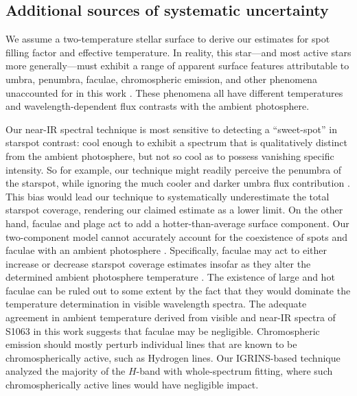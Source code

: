 \documentclass[trackchanges]{aastex631}
\begin{document}





\subsection{Additional sources of systematic uncertainty}
\label{sec:uncertainties}
We assume a two-temperature stellar surface to derive our estimates for spot filling factor and effective temperature.  In reality, this star---and most active stars more generally---must exhibit a range of apparent surface features attributable to umbra, penumbra, faculae, chromospheric emission, and other phenomena unaccounted for in this work \citep{berdyugina05, 2009A&ARv..17..251S}. These phenomena all have different temperatures and wavelength-dependent flux contrasts with the ambient photosphere.

Our near-IR spectral technique is most sensitive to detecting a ``sweet-spot'' in starspot contrast: cool enough to exhibit a spectrum that is qualitatively distinct from the ambient photosphere, but not so cool as to possess vanishing specific intensity.  So for example, our technique might readily perceive the penumbra of the starspot, while ignoring the much cooler and darker umbra flux contribution \citep{1981ApJ...250..327V}.  This bias would lead our technique to systematically underestimate the total starspot coverage, rendering our claimed estimate as a lower limit.  On the other hand, faculae and plage act to add a hotter-than-average surface component. Our two-component model cannot accurately account for the coexistence of spots and faculae with an ambient photosphere \citep{1998A&A...329..747S}. Specifically, faculae may act to either increase or decrease starspot coverage estimates insofar as they alter the determined ambient photosphere temperature  \citep{2019AJ....157...11W}. The existence of large and hot faculae can be ruled out to some extent by the fact that they would dominate the temperature determination in visible wavelength spectra.  The adequate agreement in ambient temperature derived from visible \citep{mathieu03} and near-IR spectra of S1063 in this work suggests that faculae may be negligible.  Chromospheric emission should mostly perturb individual lines that are known to be chromospherically active, such as Hydrogen lines.  Our IGRINS-based technique analyzed the majority of the $H$-band with whole-spectrum fitting, where such chromospherically active lines would have negligible impact.
\end{document}

